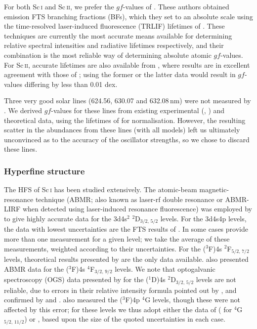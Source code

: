 \documentclass[traditabstract]{aa}
\begin{document}
For both Sc\,\textsc{i} and Sc\,\textsc{ii}, we prefer the $gf$-values of \citet{Lawler89}.  These authors obtained
emission FTS branching fractions (BFs), which they set to an absolute scale using the time-resolved laser-induced
fluorescence (TRLIF) lifetimes of \citet{Marsden88}.  These techniques are currently the most accurate means available
for determining relative spectral intensities and radiative lifetimes respectively, and their combination is the most
reliable way of determining absolute atomic $gf$-values.  For Sc\,\textsc{ii}, accurate lifetimes are also available
from \citet{Vogel85}, where results are in excellent agreement with those of \citet{Marsden88}; 
using the former or the latter data would result in $gf$-values differing by less than
0.01 dex.  

Three very good solar lines (624.56, 630.07 and 632.08\,nm) were not measured by \citet{Lawler89}.  We derived $gf$-values for these lines from existing experimental (\citealt{CB62}, ) and theoretical \citep{Kuruczweb} data, using the lifetimes of \citet{Vogel85} for normalisation.  However, the resulting scatter in the abundances from these lines (with all models) left us ultimately unconvinced as to the accuracy of the oscillator strengths, so we chose to discard these lines.

\subsubsection{Hyperfine structure}
\label{Schfs}

The HFS of Sc\,\textsc{i} has been studied extensively.  The atomic-beam magnetic-resonance technique (ABMR; also
known as laser-rf double resonance or ABMR-LIRF when detected using laser-induced resonance fluorescence) was employed
by \citet{Childs71} to give highly accurate data for the 3d4s$^2$ $^2$D$_{3/2,\,5/2}$ levels.
For the 3d4s4p levels, the data with lowest uncertainties are the FTS results of \citet{Aboussaid96}.  In some cases
\citet{Aboussaid96} provide more than one measurement for a given level; we take the average of these measurements,
weighted according to their uncertainties.  For the ($^3$F)4s $^2$F$_{5/2,\,7/2}$ levels, theoretical
results presented by \citet{Basar04} are the only data available.  \citet{Ertmer76} also presented ABMR data for the
($^3$F)4s $^4$F$_{3/2,\,9/2}$ levels.
We note that optogalvanic spectroscopy (OGS) data presented by \citet{Singh91} for the ($^1$D)4s $^2$D$_{3/2,\,5/2}$ levels are not
reliable, due to errors in their relative intensity formula pointed out by \citet{Aboussaid96}, and confirmed by
\citet{Bieron02} and \citet{Basar04}.  \citeauthor{Singh91} also measured the ($^3$F)4p $^4$G levels, though these
were not affected by this error; for these levels we thus adopt either the data of \citeauthor{Singh91} (
for $^4$G$_{5/2,\,11/2}$) or \citet[][for $^4$G$_{7/2,\,9/2}$]{Ertmer76}, based upon the
size of the quoted uncertainties in each case.
\end{document}
